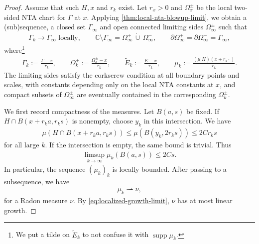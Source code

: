 \documentclass[11pt,a4paper,english,reqno]{amsart}
\numberwithin{equation}{section}
\newcommand{\CC}[0]{\mathbb{C}}
\DeclareMathOperator{\supp}{supp}
\newcommand{\weaklyto}{\rightharpoonup}
\renewcommand{\restriction}{\big|}
\numberwithin{definition}{section}
\begin{document}
\begin{proof}
    Assume that such $H,x$ and $r_k$ exist.  Let $r_x>0$ and $Ω_x^\pm$ be the local two-sided NTA chart for $Γ$ at $x$.
    Applying \cref{thm:local-nta-blowup-limit}, we obtain a (sub)sequence, a closed set $Γ_∞$ and open connected limiting sides $Ω_∞^\pm$ such that
    \begin{align}\label{eq:local-nta-blowup-limit-output}
        Γ_k\to Γ_∞ \text{ locally},\qquad
        \CC\setminus Γ_∞=Ω_∞^+\,\dot\cup\,Ω_∞^-,
        \qquad
        \partial Ω_∞^+=\partial Ω_∞^-=Γ_∞,
    \end{align}
    where\footnote{We put a tilde on $\widetilde E_k$ to not confuse it with $\supp μ_k$.}
    \begin{align}
        Γ_k:=\frac{Γ-x}{r_k},\qquad
        Ω_k^\pm:=\frac{Ω_x^\pm-x}{r_k},\qquad
        \widetilde E_k:=\frac{E-x}{r_k},\qquad
        μ_k:=\frac{(μ\restriction H)(x+r_k\cdot)}{r_k} .
    \end{align}
    The limiting sides satisfy the corkscrew condition at all boundary points and scales, with constants depending only on the local NTA constants at $x$, and compact subsets of $Ω_∞^\pm$ are eventually contained in the corresponding $Ω_k^\pm$.

    We first record compactness of the measures.  Let $B(a,s)$ be fixed.  If $H\cap B(x+r_ka,r_ks)$ is nonempty, choose $y_k$ in this intersection.
    We have
    \begin{align}
        μ(H\cap B(x+r_ka,r_ks))\le μ(B(y_k,2r_ks))\le 2C r_ks
    \end{align}
    for all large $k$.  If the intersection is empty, the same bound is trivial.  Thus
    \begin{align}\label{eq:localized-growth-limit}
        \limsup_{k\to\infty} μ_k(B(a,s))\le 2Cs .
    \end{align}
    In particular, the sequence $(μ_k)_k$ is locally bounded.  After passing to a subsequence, we have
    \begin{align}
        μ_k\weaklyto ν, \label{eq:limit-measure-blowup-main-lemma}
    \end{align}
    for a Radon measure $ν$.  By \cref{eq:localized-growth-limit}, $ν$ has at most linear growth.


\end{proof}
\end{document}
